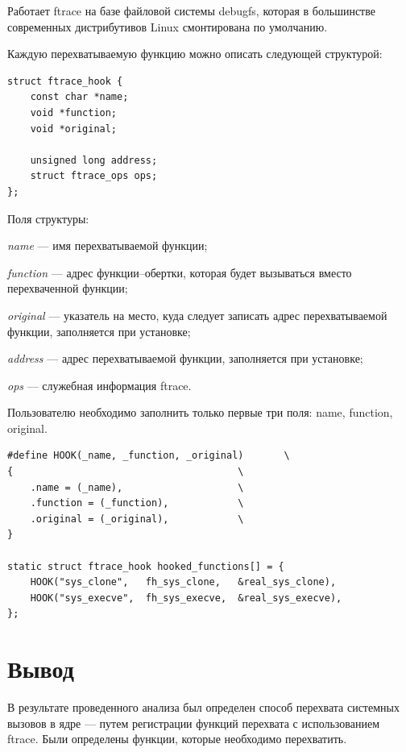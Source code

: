 Работает ftrace на базе файловой системы debugfs, которая в большинстве современных дистрибутивов Linux смонтирована по умолчанию. 

Каждую перехватываемую функцию можно описать следующей структурой:
\clearpage
\begin{lstlisting}[label=code:ftracehook,caption=Структура ftrace\_hook]
struct ftrace_hook {
	const char *name;
	void *function;
	void *original;
	
	unsigned long address;
	struct ftrace_ops ops;
};
\end{lstlisting}

Поля структуры:

\textit{name} --- имя перехватываемой функции;

\textit{function} ---  адрес функции--обертки, которая будет вызываться вместо перехваченной функции;

\textit{original} ---  указатель на место, куда следует записать адрес перехватываемой функции, заполняется при установке;

\textit{address} --- адрес перехватываемой функции, заполняется при установке;

\textit{ops} --- служебная информация ftrace.

Пользователю необходимо заполнить только первые три поля: name, function, original. 

\begin{lstlisting}[label=code:ftracehookexm,caption=Пример заполнения структуры ftrace\_hook]
#define HOOK(_name, _function, _original)       \
{                                       \
	.name = (_name),                    \
	.function = (_function),            \
	.original = (_original),            \
}

static struct ftrace_hook hooked_functions[] = {
	HOOK("sys_clone",   fh_sys_clone,   &real_sys_clone),
	HOOK("sys_execve",  fh_sys_execve,  &real_sys_execve),
};
\end{lstlisting}



\section*{Вывод}

В результате проведенного анализа был определен способ перехвата системных вызовов в ядре --- путем регистрации функций перехвата с использованием ftrace. Были определены функции, которые необходимо перехватить.